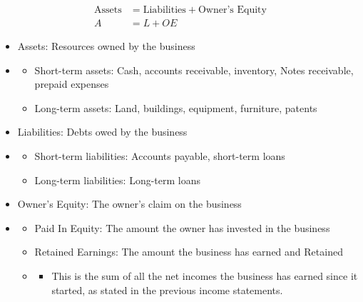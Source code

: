 \begin{theorem}
    \begin{align}
        \text{Assets} & = \text{Liabilities} + \text{Owner's Equity} \\
        A             & = L + OE
    \end{align}
\end{theorem}

\begin{proposition}
    \begin{itemize}
        \item Assets: Resources owned by the business
        \item[] \begin{itemize}
                  \item Short-term assets: Cash, accounts receivable, inventory, Notes receivable, prepaid expenses
                  \item Long-term assets: Land, buildings, equipment, furniture, patents
              \end{itemize}
        \item Liabilities: Debts owed by the business
        \item[] \begin{itemize}
                  \item Short-term liabilities: Accounts payable, short-term loans
                  \item Long-term liabilities: Long-term loans
              \end{itemize}
        \item Owner's Equity: The owner's claim on the business
        \item[] \begin{itemize}
                  \item Paid In Equity: The amount the owner has invested in the business
                  \item Retained Earnings: The amount the business has earned and Retained
                  \item[] \begin{itemize}
                            \item This is the sum of all the net incomes the business has earned since it started, as stated in the previous income statements.
                        \end{itemize}
              \end{itemize}
    \end{itemize}
\end{proposition}

